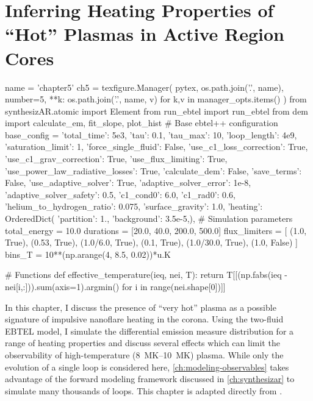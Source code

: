 \chapter{Inferring Heating Properties of ``Hot'' Plasmas in Active Region Cores}\label{ch:inferring_hot_plasma}
\thispagestyle{firstpageofchapterstyle}

\begin{pycode}[chapter5]
name = 'chapter5'
ch5 = texfigure.Manager(
    pytex,
    os.path.join('.', name),
    number=5,
    **{k: os.path.join('.', name, v) for k,v in manager_opts.items()}
)
from synthesizAR.atomic import Element
from run_ebtel import run_ebtel
from dem import calculate_em, fit_slope, plot_hist
# Base ebtel++ configuration
base_config = {
    'total_time': 5e3,
    'tau': 0.1,
    'tau_max': 10,
    'loop_length': 4e9,
    'saturation_limit': 1,
    'force_single_fluid': False,
    'use_c1_loss_correction': True,
    'use_c1_grav_correction': True,
    'use_flux_limiting': True,
    'use_power_law_radiative_losses': True,
    'calculate_dem': False,
    'save_terms': False,
    'use_adaptive_solver': True,
    'adaptive_solver_error': 1e-8,
    'adaptive_solver_safety': 0.5,
    'c1_cond0': 6.0,
    'c1_rad0': 0.6,
    'helium_to_hydrogen_ratio': 0.075,
    'surface_gravity': 1.0,
    'heating': OrderedDict({
        'partition': 1.,
        'background': 3.5e-5,}),
}
# Simulation parameters
total_energy = 10.0
durations = [20.0, 40.0, 200.0, 500.0]
flux_limiters = [
    (1.0, True),
    (0.53, True),
    (1.0/6.0, True),
    (0.1, True),
    (1.0/30.0, True),
    (1.0, False)
]
bins_T = 10**(np.arange(4, 8.5, 0.02))*u.K

# Functions
def effective_temperature(ieq, nei, T):
    return T[[(np.fabs(ieq - nei[i,:])).sum(axis=1).argmin() for i in range(nei.shape[0])]]
\end{pycode}

In this chapter, I discuss the presence of ``very hot'' plasma as a possible signature of impulsive nanoflare heating in the corona. Using the two-fluid EBTEL model, I simulate the differential emission measure distribution for a range of heating properties and discuss several effects which can limit the observability of high-temperature (\SIrange{8}{10}{\mega\kelvin}) plasma. While only the evolution of a single loop is considered here, \autoref{ch:modeling-observables} takes advantage of the forward modeling framework discussed in \autoref{ch:synthesizar} to simulate many thousands of loops. This chapter is adapted directly from \citet{barnes_inference_2016}.

